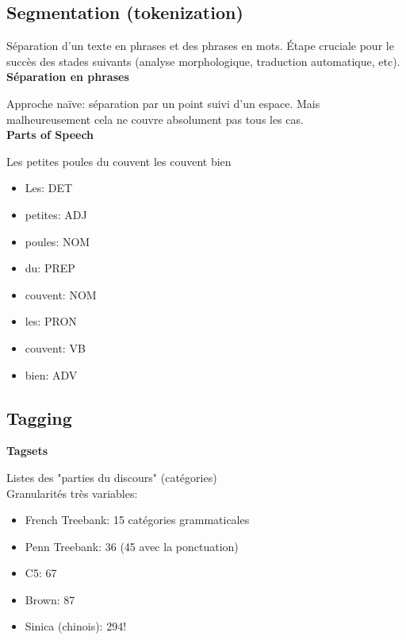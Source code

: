 \subsection{Segmentation (tokenization)}

Séparation d'un texte en phrases et des phrases en mots. Étape cruciale pour le succès des stades suivants (analyse morphologique, traduction automatique, etc).\\

\textbf{Séparation en phrases}

Approche naïve: séparation par un point suivi d'un espace. Mais malheureusement cela ne couvre absolument pas tous les cas.\\

\textbf{Parts of Speech}

Les petites poules du couvent les couvent bien \\

\begin{minipage}[t]{0.5\textwidth}
\begin{itemize}
\item Les: DET
\item petites: ADJ
\item poules: NOM
\item du: PREP
\end{itemize}
\end{minipage}
\begin{minipage}[t]{0.5\textwidth}
\begin{itemize}
 \item couvent: NOM
\item les: PRON
\item couvent: VB
\item bien: ADV
\end{itemize}
\end{minipage}

\subsection{Tagging}

\textbf{Tagsets}

Listes des "parties du discours" (catégories)\\

Granularités très variables:
\begin{itemize}
    \item French Treebank: 15 catégories grammaticales
    \item Penn Treebank: 36 (45 avec la ponctuation)
    \item C5: 67
    \item Brown: 87
    \item Sinica (chinois): 294!\\
\end{itemize}

